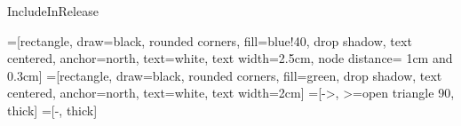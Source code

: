 %
\usepackage[main=english,portuguese]{babel}
\usepackage[utf8]{inputenc}
\usepackage{iflang}

\usepackage[margin={2cm, 2cm}]{geometry}
\setlength{\columnsep}{1cm}

\usepackage[printonlyused,nolist]{acronym}

\usepackage{cite}

\usepackage[pdftex]{graphicx}

\usepackage[cmex10]{amsmath}

\usepackage{algorithmic}

\usepackage{array}

\usepackage[font=normalsize,labelfont=sf,textfont=sf]{subfig}
\captionsetup[table]{skip=10pt}

\begingroup\expandafter\expandafter\expandafter\endgroup
\expandafter\ifx\csname IncludeInRelease\endcsname\relax
  \usepackage{fixltx2e}
\fi

\usepackage{url}

\usepackage{eso-pic}
\usepackage[
  contents={},
  opacity=1,
  scale=1,
  color=blue!90
  ]{background}

\usepackage{ifthen}

\usepackage[]{cleveref}

\usepackage{amsmath}
\usepackage{graphicx}
\usepackage{xcolor}
\usepackage{tikz}
\usepackage{float}
\usetikzlibrary{positioning,shapes,shadows,arrows}
=[rectangle, draw=black, rounded corners, fill=blue!40, drop shadow,
        text centered, anchor=north, text=white, text width=2.5cm, node distance= 1cm and 0.3cm]
=[rectangle, draw=black, rounded corners, fill=green, drop shadow,
        text centered, anchor=north, text=white, text width=2cm]
=[->, >=open triangle 90, thick]
=[-, thick]

\usepackage{hyperref}

\usepackage{listings}
\usepackage{booktabs}
